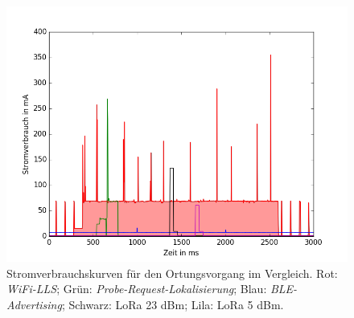 \begin{figure}[h!]
  \centering
	\includegraphics[width=\textwidth]{plots/alle.png}
  \caption{Stromverbrauchskurven für den Ortungsvorgang im Vergleich. Rot: \emph{WiFi-LLS}; Grün: \emph{Probe-Request-Lokalisierung}; Blau: \emph{BLE-Advertising}; Schwarz: LoRa 23 dBm; Lila: LoRa 5 dBm.}
  \label{fig:alle}
\end{figure}


